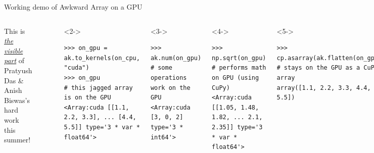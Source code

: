 \documentclass[aspectratio=169]{beamer}
\begin{document}
\begin{frame}[fragile]{Working demo of Awkward Array on a GPU}
\large
\vspace{0.5 cm}
\begin{columns}
This is \underline{\it the visible part} of Pratyush Das \& Anish Biswas's hard work this summer!

\small
\begin{verbatim}
>>> import awkward1 as ak, numpy as np, cupy as cp
\end{verbatim}
\begin{verbatim}
>>> on_cpu = ak.Array([[1.1, 2.2, 3.3], [], [4.4, 5.5]])
>>> on_cpu                           # this jagged array is on the CPU
<Array [[1.1, 2.2, 3.3], [], [4.4, 5.5]] type='3 * var * float64'>
\end{verbatim}
\begin{uncoverenv}<2->
\begin{verbatim}
>>> on_gpu = ak.to_kernels(on_cpu, "cuda")
>>> on_gpu                           # this jagged array is on the GPU
<Array:cuda [[1.1, 2.2, 3.3], ... [4.4, 5.5]] type='3 * var * float64'>
\end{verbatim}
\end{uncoverenv}
\begin{uncoverenv}<3->
\begin{verbatim}
>>> ak.num(on_gpu)                   # some operations work on the GPU
<Array:cuda [3, 0, 2] type='3 * int64'>
\end{verbatim}
\end{uncoverenv}
\begin{uncoverenv}<4->
\begin{verbatim}
>>> np.sqrt(on_gpu)                  # performs math on GPU (using CuPy)
<Array:cuda [[1.05, 1.48, 1.82, ... 2.1, 2.35]] type='3 * var * float64'>
\end{verbatim}
\end{uncoverenv}
\begin{uncoverenv}<5->
\begin{verbatim}
>>> cp.asarray(ak.flatten(on_gpu))   # stays on the GPU as a CuPy array
array([1.1, 2.2, 3.3, 4.4, 5.5])
\end{verbatim}
\end{uncoverenv}
\end{columns}
\end{frame}
\end{document}

